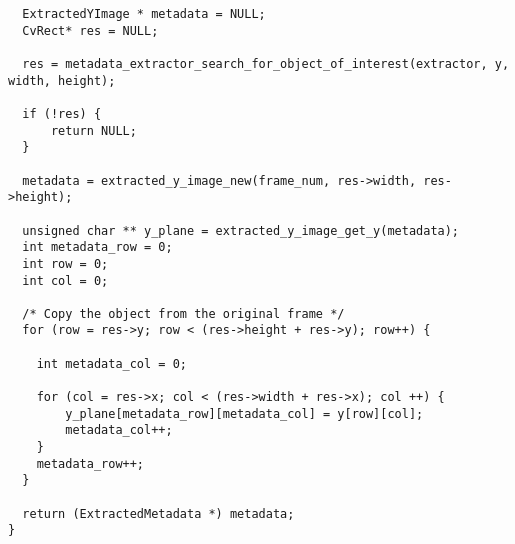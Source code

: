 \begin{lstlisting}
  ExtractedYImage * metadata = NULL;
  CvRect* res = NULL;

  res = metadata_extractor_search_for_object_of_interest(extractor, y, width, height);

  if (!res) {
      return NULL;
  }

  metadata = extracted_y_image_new(frame_num, res->width, res->height);

  unsigned char ** y_plane = extracted_y_image_get_y(metadata);
  int metadata_row = 0;
  int row = 0;
  int col = 0;

  /* Copy the object from the original frame */
  for (row = res->y; row < (res->height + res->y); row++) {

    int metadata_col = 0;

    for (col = res->x; col < (res->width + res->x); col ++) {
        y_plane[metadata_row][metadata_col] = y[row][col];
        metadata_col++;
    }
    metadata_row++;
  }

  return (ExtractedMetadata *) metadata;
}

\end{lstlisting}

